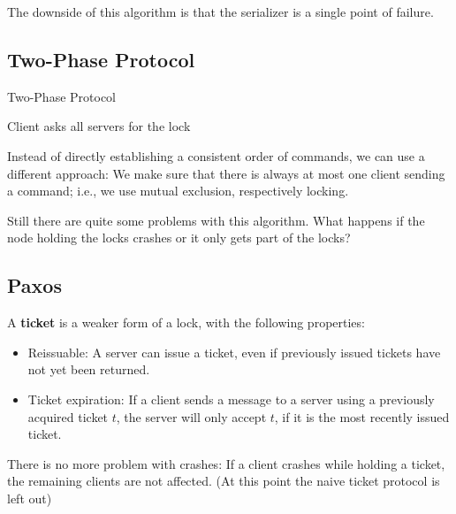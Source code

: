 \medskip

The downside of this algorithm is that the serializer is a single point of failure.

\subsection{Two-Phase Protocol}

\begin{algorithm}[H]
\caption{Two-Phase Protocol}
	Client asks all servers for the lock \\
\end{algorithm}

\medskip

Instead of directly establishing a consistent order of commands, we can use a different approach: We make sure that there is always at most one client sending a command; i.e., we use mutual exclusion, respectively locking. \medskip

Still there are quite some problems with this algorithm. What happens if the node holding the locks crashes or it only gets part of the locks?

\subsection{Paxos}

A \textbf{ticket} is a weaker form of a lock, with the following properties:
\begin{itemize}
	\item Reissuable: A server can issue a ticket, even if previously issued tickets have not yet been returned.
	\item Ticket expiration: If a client sends a message to a server using a previously acquired ticket $t$, the server will only accept $t$, if it is the most recently issued ticket.
\end{itemize}

There is no more problem with crashes: If a client crashes while holding a ticket, the remaining clients are not affected. (At this point the naive ticket protocol is left out) \medskip

